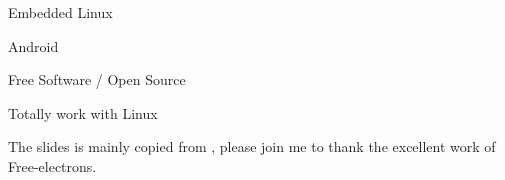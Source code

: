 \startitemize
    \item Embedded Linux
    \item Android
    \item Free Software / Open Source
    \item Totally work with Linux
\stopitemize

The slides is mainly copied from , please join me to thank the excellent work of Free-electrons.